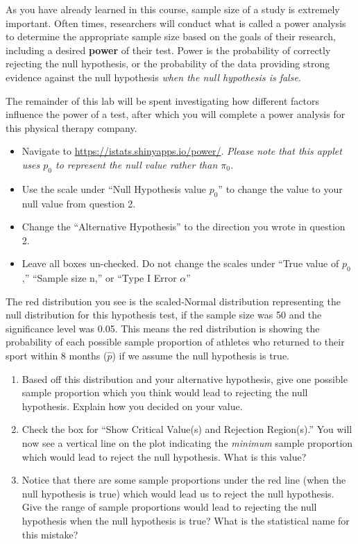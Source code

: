 \documentclass[
]{report}
\begin{document}
As you have already learned in this course, sample size of a study is extremely important. Often times, researchers will conduct what is called a power analysis to determine the appropriate sample size based on the goals of their research, including a desired \textbf{power} of their test. Power is the probability of correctly rejecting the null hypothesis, or the probability of the data providing strong evidence against the null hypothesis \emph{when the null hypothesis is false}.

The remainder of this lab will be spent investigating how different factors influence the power of a test, after which you will complete a power analysis for this physical therapy company.

\begin{itemize}
\item
  Navigate to \url{https://istats.shinyapps.io/power/}. \emph{Please note that this applet uses \(p_0\) to represent the null value rather than \(\pi_0\).}
\item
  Use the scale under ``Null Hypothesis value \(p_0\)'' to change the value to your null value from question 2.
\item
  Change the ``Alternative Hypothesis'' to the direction you wrote in question 2.
\item
  Leave all boxes un-checked. Do not change the scales under ``True value of \(p_0\),'' ``Sample size n,'' or ``Type I Error \(\alpha\)''
\end{itemize}

The red distribution you see is the scaled-Normal distribution representing the null distribution for this hypothesis test, if the sample size was 50 and the significance level was 0.05. This means the red distribution is showing the probability of each possible sample proportion of athletes who returned to their sport within 8 months (\(\hat{p}\)) if we assume the null hypothesis is true.

\begin{enumerate}
\def\labelenumi{\arabic{enumi}.}
\setcounter{enumi}{2}
\item
  Based off this distribution and your alternative hypothesis, give one possible sample proportion which you think would lead to rejecting the null hypothesis. Explain how you decided on your value.
  \vspace{0.25in}
\item
  Check the box for ``Show Critical Value(s) and Rejection Region(s).'' You will now see a vertical line on the plot indicating the \emph{minimum} sample proportion which would lead to reject the null hypothesis. What is this value?\\
  \vspace{0.25in}
\item
  Notice that there are some sample proportions under the red line (when the null hypothesis is true) which would lead us to reject the null hypothesis. Give the range of sample proportions would lead to rejecting the null hypothesis when the null hypothesis is true? What is the statistical name for this mistake?
  \vspace{0.4in}
\end{enumerate}
\end{document}
